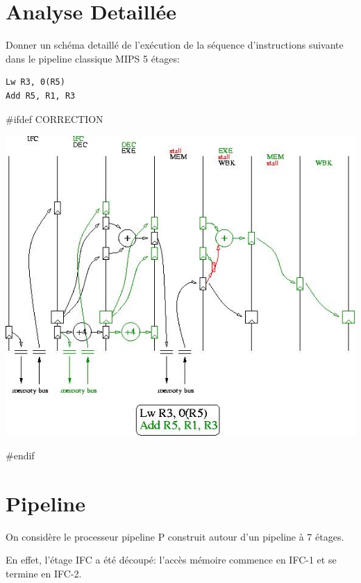 %
%

\section{Analyse Detaill\'ee}

Donner un sch\'ema detaill\'e de l'ex\'ecution de la s\'equence d'instructions
suivante dans le pipeline classique MIPS 5 \'etages:

\begin{verbatim}
Lw R3, 0(R5)
Add R5, R1, R3
\end{verbatim}

#ifdef CORRECTION
\begin{correction}

  \begin{center}
    \includegraphics[scale=0.7]{figures/correction-analyse-detaillee.jpg}
  \end{center}

\end{correction}
#endif

%
%

\section{Pipeline}

On consid\`ere le processeur pipeline P construit autour d'un pipeline
\`a 7 \'etages.

En effet, l'\'etage IFC a \'et\'e d\'ecoup\'e: l'acc\`es m\'emoire commence
en IFC-1 et se termine en IFC-2.

